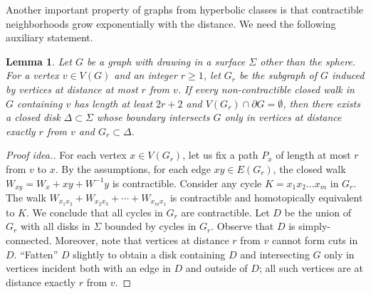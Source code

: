 \documentclass[12pt,twoside,openright,a4paper]{book}
\newtheorem{lemma}[theorem]{Lemma}
\begin{document}
Another important property of graphs from hyperbolic classes is that contractible neighborhoods grow exponentially
with the distance.  We need the following auxiliary statement.
\begin{lemma}\label{lemma:disknbr}
Let $G$ be a graph with drawing in a surface $\Sigma$ other than the sphere.
For a vertex $v\in V(G)$ and an integer $r\ge 1$, let $G_r$ be the subgraph of $G$ induced by vertices
at distance at most $r$ from $v$.  If every non-contractible closed walk in $G$ containing $v$ has length at least
$2r+2$ and $V(G_r)\cap \partial G=\emptyset$,
then there exists a closed disk $\Delta\subset\Sigma$ whose boundary intersects $G$ only in vertices at distance
exactly $r$ from $v$ and $G_r\subset\Delta$.
\end{lemma}
\begin{proof}[Proof idea.]
For each vertex $x\in V(G_r)$, let us fix a path $P_x$ of length at most $r$ from $v$ to $x$.
By the assumptions, for each edge $xy\in E(G_r)$, the closed walk
$W_{xy}=W_x+xy+W^{-1}y$ is contractible.  Consider any cycle $K=x_1x_2\ldots x_m$ in $G_r$.
The walk $W_{x_1x_2}+W_{x_2x_3}+\cdots+W_{x_mx_1}$ is contractible and homotopically equivalent to $K$.
We conclude that all cycles in $G_r$ are contractible.  Let $D$ be the union of $G_r$ with all disks in $\Sigma$
bounded by cycles in $G_r$.  Observe that $D$ is simply-connected.  Moreover, note that vertices at distance $r$ from $v$
cannot form cuts in $D$.  ``Fatten'' $D$ slightly to obtain a disk containing $D$ and intersecting $G$ only in
vertices incident both with an edge in $D$ and outside of $D$; all such vertices are at distance exactly $r$ from $v$.
\end{proof}
\end{document}
